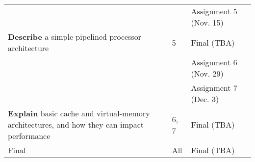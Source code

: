 \begin{frame}[fragile]
\begin{tcolorbox}
{{\begin{tabular}{p{5cm} | p{1cm} | p{37mm}}
         &  & Assignment 5 (Nov. 15) \\
        \multirow{-2}{5cm}{\textbf{Describe} a simple pipelined processor architecture} & \multirow{-2}{2cm}{5} & Final (TBA) \\
        \hline

         &  & Assignment 6 (Nov. 29) \\
         &  & Assignment 7 (Dec. 3) \\
        \multirow{-3}{5cm}{\textbf{Explain} basic cache and virtual-memory architectures, and how they can impact performance} & \multirow{-3}{2cm}{6, 7} & Final (TBA) \\
        \hline
        Final & All & Final (TBA) \\

        \hline
    \end{tabular}
}}
  \end{tcolorbox}
\end{frame}

\newpage

